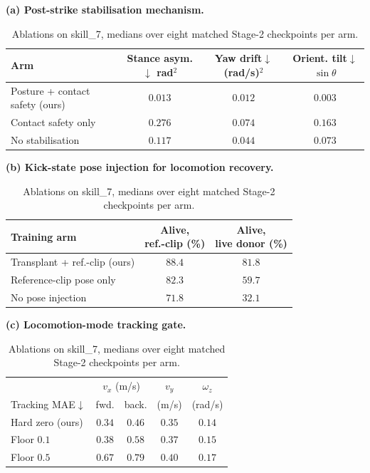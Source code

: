 \documentclass[letterpaper, 10 pt, conference]{ieeeconf}  %
\begin{document}
\begin{table}[htbp]
\centering
\caption{Ablations on skill\_7, medians over eight matched Stage-2
checkpoints per arm.}
\label{tab:ablations}
\footnotesize
\setlength{\tabcolsep}{4pt}

\textbf{(a) Post-strike stabilisation mechanism.}\\[2pt]
\scriptsize
\setlength{\tabcolsep}{3pt}
\begin{tabular}{@{}p{3.15cm}ccc@{}}
\toprule
Arm & \makecell{Stance\\asym.$\downarrow$\\[-1pt]{\tiny rad$^2$}}
    & \makecell{Yaw\\drift$\downarrow$\\[-1pt]{\tiny (rad/s)$^2$}}
    & \makecell{Orient.\\tilt$\downarrow$\\[-1pt]{\tiny $\sin\theta$}} \\
\midrule
Posture + contact safety (ours) & $0.013$ & $0.012$ & $0.003$ \\
Contact safety only             & $0.276$ & $0.074$ & $0.163$ \\
No stabilisation                & $0.117$ & $0.044$ & $0.073$ \\
\bottomrule
\end{tabular}
\setlength{\tabcolsep}{4pt}

\vspace{2pt}
\textbf{(b) Kick-state pose injection for locomotion recovery.}\\[2pt]
\scriptsize
\setlength{\tabcolsep}{3pt}
\begin{tabular}{@{}p{3.1cm}cc@{}}
\toprule
Training arm & \makecell{Alive,\\ref.-clip (\%)} & \makecell{Alive,\\live donor (\%)} \\
\midrule
Transplant + ref.-clip (ours) & $88.4$ & $81.8$ \\
Reference-clip pose only      & $82.3$ & $59.7$ \\
No pose injection             & $71.8$ & $32.1$ \\
\bottomrule
\end{tabular}

\vspace{2pt}
\textbf{(c) Locomotion-mode tracking gate.}\\[2pt]
\begin{tabular}{@{}lcccc@{}}
\toprule
 & \multicolumn{2}{c}{$v_x$ (m/s)} & $v_y$ & $\omega_z$ \\
\cmidrule(lr){2-3}
Tracking MAE$\downarrow$ & fwd. & back. & (m/s) & (rad/s) \\
\midrule
Hard zero (ours) & $0.34$ & $0.46$ & $0.35$ & $0.14$ \\
Floor $0.1$      & $0.38$ & $0.58$ & $0.37$ & $0.15$ \\
Floor $0.5$      & $0.67$ & $0.79$ & $0.40$ & $0.17$ \\
\bottomrule
\end{tabular}
\footnotesize
\setlength{\tabcolsep}{4pt}

\end{table}
\end{document}
